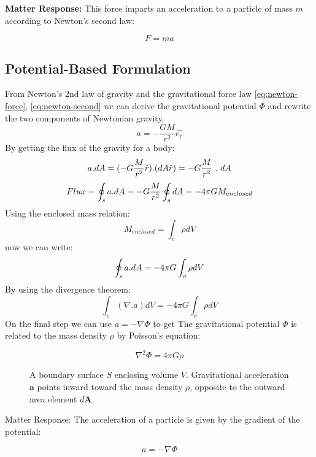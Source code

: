 \documentclass[11pt, a4paper]{report}
\newcommand{\eqn}[1]{\hyperref[#1]{\eqref{#1}}}
\begin{document}
\textbf{Matter Response:} This force imparts an acceleration to a particle of mass $m$ according to Newton's second law:

\begin{equation}\label{eq:newton-second}
    F = ma
\end{equation}

\subsection*{Potential-Based Formulation}
From Newton's 2nd law of gravity and the gravitational force law \eqn{eq:newton-force}, \eqn{eq:newton-second} we can derive the gravitational potential $\Phi$ and rewrite the two components of Newtonian gravity.
\begin{equation}
    a = -\frac{GM}{r^2} \hat{e_r}
\end{equation}
By getting the flux of the gravity for a body:
$$a.dA = (-G \frac{M}{r^2} \space \hat{r}).(dA \space \space \hat{r}) = -G \frac{M}{r^2}\ . \ dA$$
$$Flux  = \oint_s a \space . \space dA = - G \frac{M}{r^2} \oint_s dA = - 4 \pi G M_{enclosed}$$
Using the enclosed mass relation:
$$M_{enclosed} = \int_v \rho dV$$
now we can write: 
$$\oint_s a \space . \space dA = - 4 \pi G \int_v \rho dV$$
By using the divergence theorem:
$$\int_v (\nabla . a) dV = - 4 \pi G \int_v \rho dV$$
On the final step we can use $a = - \nabla \Phi$ to get The gravitational potential $\Phi$ is related to the mass density $\rho$ by Poisson's equation:

\begin{equation}\label{eq:poisson}
    \nabla^2 \Phi = 4\pi G \rho
\end{equation}

\begin{figure}[htbp]
    \centering
    
    \caption{A boundary surface $S$ enclosing volume $V$. Gravitational acceleration $\mathbf{a}$ points inward toward the mass density $\rho$, opposite to the outward area element $d\mathbf{A}$.}
    \label{fig:grav_flux}
\end{figure}

Matter Response: The acceleration of a particle is given by the gradient of the potential:

\begin{equation}\label{eq:potential-accel}
    a = -\nabla \Phi
\end{equation}
\end{document}

